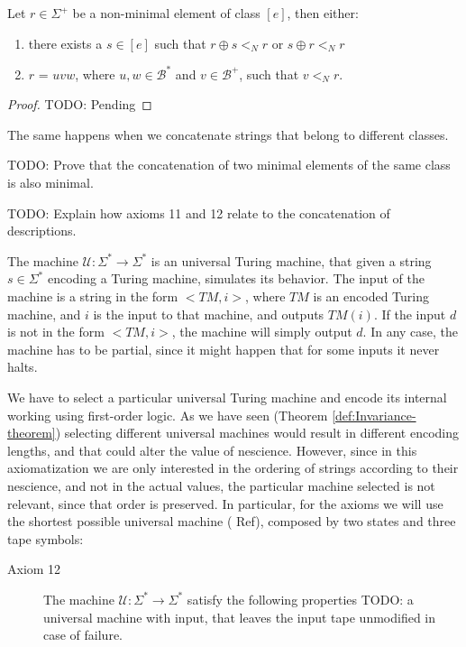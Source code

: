 \begin{proposition}
Let $r \in \Sigma^{+}$ be a non-minimal element of class $[e]$, then either:
\begin{enumerate}[label=(\roman*)]
\item there exists a $s \in [e]$ such that $r \oplus s <_N r$ or $s \oplus r <_N r$
\item $r$ = $uvw$, where $u, w \in \mathcal{B}^\ast$ and $v \in \mathcal{B}^{+}$, such that $v <_N r$.
\end{enumerate}
\end{proposition}
\begin{proof}
{\color{red} TODO: Pending}
\end{proof}

The same happens when we concatenate strings that belong to different classes.

{\color{red} TODO: Prove that the concatenation of two minimal elements of the same class is also minimal.}

{\color{red} TODO: Explain how axioms 11 and 12 relate to the concatenation of descriptions.}

The machine $\mathcal{U} : \Sigma^\ast \rightarrow \Sigma^\ast$ is an universal Turing machine, that given a string $s \in \Sigma^\ast$ encoding a Turing machine, simulates its behavior. The input of the machine is a string in the form $<TM, i>$, where $TM$ is an encoded Turing machine, and $i$ is the input to that machine, and outputs $TM(i)$. If the input $d$ is not in the form $<TM, i>$, the machine will simply output $d$. In any case, the machine has to be partial, since it might happen that for some inputs it never halts.

We have to select a particular universal Turing machine and encode its internal working using first-order logic. As we have seen (Theorem \ref{def:Invariance-theorem}) selecting different universal machines would result in different encoding lengths, and that could alter the value of nescience. However, since in this axiomatization we are only interested in the ordering of strings according to their nescience, and not in the actual values, the particular machine selected is not relevant, since that order is preserved. In particular, for the axioms we will use the shortest possible universal machine ({\color{red} Ref}), composed by two states and three tape symbols:

\vskip 0.25cm

\begin{description}
\item[Axiom 12] The machine $\mathcal{U} : \Sigma^\ast \rightarrow \Sigma^\ast$ satisfy the following properties {\color{red} TODO: a universal machine with input, that leaves the input tape unmodified in case of failure.}
\end{description}

